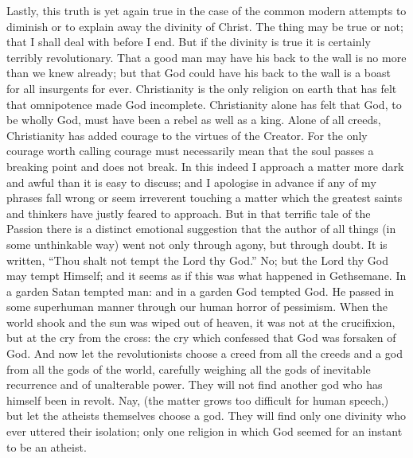 Lastly, this truth is yet again true in the case of the common modern attempts to diminish or to explain away the divinity of Christ. The thing may be true or not; that I shall deal with before I end. But if the divinity is true it is certainly terribly revolutionary. That a good man may have his back to the wall is no more than we knew already; but that God could have his back to the wall is a boast for all insurgents for ever. Christianity is the only religion on earth that has felt that omnipotence made God incomplete. Christianity alone has felt that God, to be wholly God, must have been a rebel as well as a king. Alone of all creeds, Christianity has added courage to the virtues of the Creator. For the only courage worth calling courage must necessarily mean that the soul passes a breaking point and does not break. In this indeed I approach a matter more dark and awful than it is easy to discuss; and I apologise in advance if any of my phrases fall wrong or seem irreverent touching a matter which the greatest saints and thinkers have justly feared to approach. But in that terrific tale of the Passion there is a distinct emotional suggestion that the author of all things (in some unthinkable way) went not only through agony, but through doubt. It is written, “Thou shalt not tempt the Lord thy God.” No; but the Lord thy God may tempt Himself; and it seems as if this was what happened in Gethsemane. In a garden Satan tempted man: and in a garden God tempted God. He passed in some superhuman manner through our human horror of pessimism. When the world shook and the sun was wiped out of heaven, it was not at the crucifixion, but at the cry from the cross: the cry which confessed that God was forsaken of God. And now let the revolutionists choose a creed from all the creeds and a god from all the gods of the world, carefully weighing all the gods of inevitable recurrence and of unalterable power. They will not find another god who has himself been in revolt. Nay, (the matter grows too difficult for human speech,) but let the atheists themselves choose a god. They will find only one divinity who ever uttered their isolation; only one religion in which God seemed for an instant to be an atheist.

